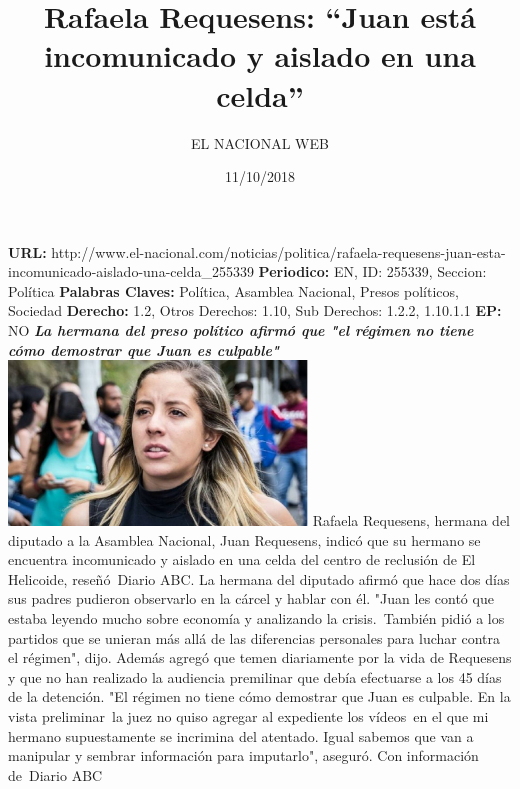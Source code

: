 \documentclass{article}%
\title{\textbf{Rafaela Requesens: “Juan está incomunicado y aislado en una celda”}}%
\author{EL NACIONAL WEB}%
\date{11/10/2018}%
\begin{document}
%
\normalsize%
\maketitle%
\textbf{URL: }%
http://www.el{-}nacional.com/noticias/politica/rafaela{-}requesens{-}juan{-}esta{-}incomunicado{-}aislado{-}una{-}celda\_255339\newline%
%
\textbf{Periodico: }%
EN, %
ID: %
255339, %
Seccion: %
Política\newline%
%
\textbf{Palabras Claves: }%
Política, Asamblea Nacional, Presos políticos, Sociedad\newline%
%
\textbf{Derecho: }%
1.2, %
Otros Derechos: %
1.10, %
Sub Derechos: %
1.2.2, 1.10.1.1\newline%
%
\textbf{EP: }%
NO\newline%
\newline%
%
\textbf{\textit{La hermana del preso político afirmó que "el régimen no tiene cómo demostrar que Juan es culpable"}}%
\newline%
\newline%
%
\includegraphics[width=300px]{193.jpg}%
\newline%
%
Rafaela Requesens, hermana del diputado a la Asamblea Nacional, Juan Requesens, indicó que su hermano se encuentra incomunicado y aislado en una celda del centro de reclusión de El Helicoide, reseñó~Diario ABC.%
\newline%
%
La hermana del diputado afirmó que hace dos días sus padres pudieron observarlo en la cárcel y hablar con él. "Juan les contó que estaba leyendo mucho sobre economía y analizando la crisis.~También pidió a los partidos que se unieran más allá de las diferencias personales para luchar contra el régimen", dijo.%
\newline%
%
Además agregó que temen diariamente por la vida de Requesens y que no han realizado la audiencia premilinar que debía efectuarse a los 45 días de la detención.%
\newline%
%
"El régimen no tiene cómo demostrar que Juan es culpable. En la vista preliminar~la juez no quiso agregar al expediente los vídeos~en el que mi hermano supuestamente se incrimina del atentado. Igual sabemos que van a manipular y sembrar información para imputarlo", aseguró.%
\newline%
%
Con información de~Diario ABC%
\newline%
%
\end{document}
